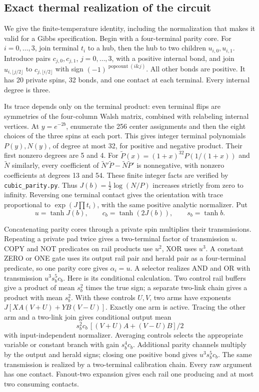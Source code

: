 \subsection{Exact thermal realization of the circuit}\label{sec:herald-proof}

We give the finite-temperature identity, including the normalization that makes it valid for a Gibbs specification. Begin with a four-terminal parity core. For \(i=0,\ldots,3\), join terminal \(t_i\) to a hub, then the hub to two children \(u_{i,0},u_{i,1}\). Introduce pairs \(c_{j,0},c_{j,1}\), \(j=0,\ldots,3\), with a positive internal bond, and join \(u_{i,\lfloor j/2\rfloor}\) to \(c_{j,\lfloor i/2\rfloor}\) with sign \((-1)^{\operatorname{popcount}(i\mathbin{\&}j)}\). All other bonds are positive. It has 20 private spins, 32 bonds, and one contact at each terminal. Every internal degree is three.

Its trace depends only on the terminal product: even terminal flips are symmetries of the four-column Walsh matrix, combined with relabeling internal vertices. At \(y=e^{-2b}\), enumerate the 256 center assignments and then the eight choices of the three spins at each port. This gives integer terminal polynomials \(P(y),N(y)\), of degree at most 32, for positive and negative product. Their first nonzero degrees are 5 and 4. For \(\widetilde P(x)=(1+x)^{32}P(1/(1+x))\) and \(\widetilde N\) similarly, every coefficient of
\(\widetilde N'\widetilde P-\widetilde N\widetilde P'\) is nonnegative, with nonzero coefficients at degrees 13 and 54. These finite integer facts are verified by \texttt{cubic\_parity.py}. Thus \(J(b)=\tfrac12\log(N/P)\) increases strictly from zero to infinity. Reversing one terminal contact gives the orientation with trace proportional to \(\exp(J\prod t_i)\), with the same positive analytic normalizer. Put
\[
 u=\tanh J(b),\qquad c_b=\tanh(2J(b)),\qquad s_b=\tanh b.
\]

Concatenating parity cores through a private spin multiplies their transmissions. Repeating a private pad twice gives a two-terminal factor of transmission \(u\). COPY and NOT predicates on rail products use \(u^2\), XOR uses \(u^3\). A constant ZERO or ONE gate uses its output rail pair and herald pair as a four-terminal predicate, so one parity core gives \(\alpha_i=u\). A selector realizes AND and OR with transmission \(u^3s_b^5c_b\). Here is its conditional calculation. Two control rail buffers give a product of mean \(s_b^2\) times the true sign; a separate two-link chain gives a product with mean \(s_b^2\). With these controls \(U,V\), two arms have exponents \(J[XA(V+U)+YB(V-U)]\). Exactly one arm is active. Tracing the other arm and a two-link join gives conditional output mean
\[
 s_b^2c_b\,[(V+U)A+(V-U)B]/2
\]
with input-independent normalizer. Averaging controls selects the appropriate variable or constant branch with gain \(s_b^4c_b\). Additional parity channels multiply by the output and herald signs; closing one positive bond gives \(u^3s_b^5c_b\). The same transmission is realized by a two-terminal calibration chain. Every raw argument has one contact. Fanout-two expansion gives each rail one producing and at most two consuming contacts.


